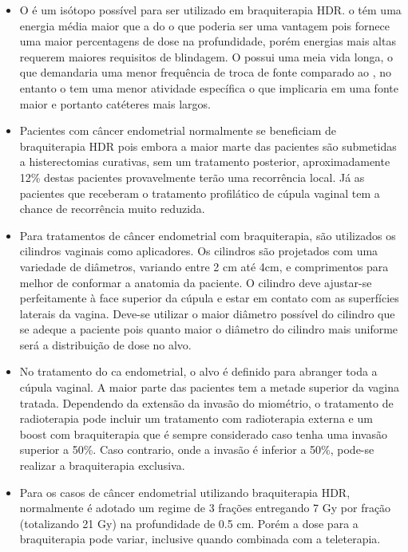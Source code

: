 \documentclass[11pt,a4paper]{article}
\newcounter{exemplo}
\begin{document}
\begin{exemplo}[Braquiterapia]
\begin{itemize}
        \item O  é um isótopo possível para ser utilizado em braquiterapia HDR. o  tém uma energia média maior que a do  o que poderia ser uma vantagem pois fornece uma maior percentagens de dose na profundidade, porém energias mais altas requerem maiores requisitos de blindagem. O  possui uma meia vida longa, o que demandaria uma menor frequência de troca de fonte comparado ao , no entanto o  tem uma menor atividade específica o que implicaria em uma fonte maior e portanto catéteres mais largos. 

        \item Pacientes com câncer endometrial normalmente se beneficiam de braquiterapia HDR pois embora a maior marte das pacientes são submetidas a histerectomias curativas, sem um tratamento posterior, aproximadamente 12\% destas pacientes provavelmente terão uma recorrência local. Já as pacientes que receberam o tratamento profilático de cúpula vaginal tem a chance de recorrência muito reduzida.
        
        \item Para tratamentos de câncer endometrial com braquiterapia, são utilizados os cilindros vaginais como aplicadores. Os cilindros são projetados com uma variedade de diâmetros, variando entre 2 cm até 4cm, e comprimentos para melhor de conformar a anatomia da paciente. O cilindro deve ajustar-se perfeitamente à face superior da cúpula e estar em contato com as superfícies laterais da vagina. Deve-se utilizar o maior diâmetro possível do cilindro que se adeque a paciente pois quanto maior o diâmetro do cilindro mais uniforme será a distribuição de dose no alvo.
        
        \item No tratamento do ca endometrial, o alvo é definido para abranger toda a cúpula vaginal. A maior parte das pacientes tem a metade superior da vagina tratada. Dependendo da extensão da invasão do miométrio, o tratamento de radioterapia pode incluir um tratamento com radioterapia externa e um boost com braquiterapia que é sempre considerado caso tenha uma invasão superior a 50\%. Caso contrario, onde a invasão é inferior a 50\%, pode-se realizar a braquiterapia exclusiva.
        
        \item Para os casos de câncer endometrial utilizando braquiterapia HDR, normalmente é adotado um regime de 3 frações entregando 7 Gy por fração (totalizando 21 Gy) na profundidade de 0.5 cm. Porém  a dose para a braquiterapia pode variar, inclusive quando combinada com a teleterapia.
        

\end{itemize}
\end{exemplo}
\end{document}
